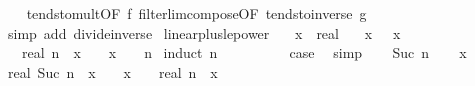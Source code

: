 \begin{isabellebody}
%
\isadelimproof
\ \ %
\endisadelimproof
%
\isatagproof
{}\isamarkupfalse%
\ tendsto{\isacharunderscore}{\kern0pt}mult{\isacharbrackleft}{\kern0pt}OF\ f\ filterlim{\isacharunderscore}{\kern0pt}compose{\isacharbrackleft}{\kern0pt}OF\ tendsto{\isacharunderscore}{\kern0pt}inverse{\isacharunderscore}{\kern0pt}{}\ g{\isacharbrackright}{\kern0pt}{\isacharbrackright}{\kern0pt}\isanewline
\ \ \isamarkupfalse%
\ {\isacharparenleft}{\kern0pt}simp\ add{\isacharcolon}{\kern0pt}\ divide{\isacharunderscore}{\kern0pt}inverse{\isacharparenright}{\kern0pt}%
\endisatagproof
{\isafoldproof}%
%
\isadelimproof
\isanewline
%
\endisadelimproof
\isanewline
{}\isamarkupfalse%
\ linear{\isacharunderscore}{\kern0pt}plus{\isacharunderscore}{\kern0pt}{}{\isacharunderscore}{\kern0pt}le{\isacharunderscore}{\kern0pt}power{\isacharcolon}{\kern0pt}\isanewline
\ \ \ x\ {\isacharcolon}{\kern0pt}{\isacharcolon}{\kern0pt}\ real\isanewline
\ \ \ x{\isacharcolon}{\kern0pt}\ {\isachardoublequoteopen}{}\ {\isasymle}\ x{\isachardoublequoteclose}\isanewline
\ \ \ {\isachardoublequoteopen}real\ n\ {\isacharasterisk}{\kern0pt}\ x\ {\isacharplus}{\kern0pt}\ {}\ {\isasymle}\ {\isacharparenleft}{\kern0pt}x\ {\isacharplus}{\kern0pt}\ {}{\isacharparenright}{\kern0pt}\ {\isacharcircum}{\kern0pt}\ n{\isachardoublequoteclose}\isanewline
%
\isadelimproof
%
\endisadelimproof
%
\isatagproof
{}\isamarkupfalse%
\ {\isacharparenleft}{\kern0pt}induct\ n{\isacharparenright}{\kern0pt}\isanewline
\ \ \isamarkupfalse%
\ {}\isanewline
\ \ \isamarkupfalse%
\ \isamarkupfalse%
\ {\isacharquery}{\kern0pt}case\ \isamarkupfalse%
\ simp\isanewline
{}\isamarkupfalse%
\isanewline
\ \ \isamarkupfalse%
\ {\isacharparenleft}{\kern0pt}Suc\ n{\isacharparenright}{\kern0pt}\isanewline
\ \ \isamarkupfalse%
\ x\ \isamarkupfalse%
\ {\isachardoublequoteopen}real\ {\isacharparenleft}{\kern0pt}Suc\ n{\isacharparenright}{\kern0pt}\ {\isacharasterisk}{\kern0pt}\ x\ {\isacharplus}{\kern0pt}\ {}\ {\isasymle}\ {\isacharparenleft}{\kern0pt}x\ {\isacharplus}{\kern0pt}\ {}{\isacharparenright}{\kern0pt}\ {\isacharasterisk}{\kern0pt}\ {\isacharparenleft}{\kern0pt}real\ n\ {\isacharasterisk}{\kern0pt}\ x\ {\isacharplus}{\kern0pt}\ {}{\isacharparenright}{\kern0pt}{\isachardoublequoteclose}\isanewline

\end{isabellebody}
